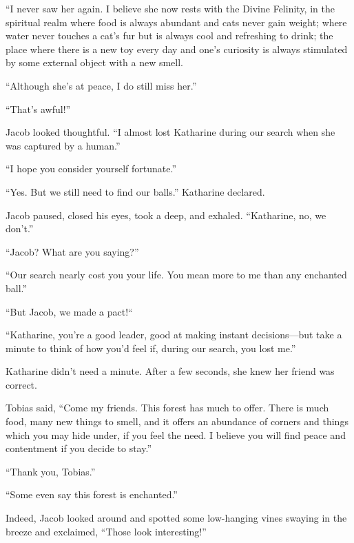 “I never saw her again. I believe she now rests with the Divine Felinity, in the spiritual realm where food is always abundant and cats never gain weight; where water never touches a cat's fur but is always cool and refreshing to drink; the place where there is a new toy every day and one's curiosity is always stimulated by some external object with a new smell.

“Although she's at peace, I do still miss her.”

“That's awful!”

Jacob looked thoughtful. “I almost lost Katharine during our search when she was captured by a human.”

“I hope you consider yourself fortunate.”

“Yes. But we still need to find our balls.” Katharine declared.

Jacob paused, closed his eyes, took a deep, and exhaled. “Katharine, no, we don't.”

“Jacob? What are you saying?”

“Our search nearly cost you your life. You mean more to me than any enchanted ball.”

“But Jacob, we made a pact!“

“Katharine, you're a good leader, good at making instant decisions—but take a minute to think of how you'd feel if, during our search, you lost me.”

Katharine didn't need a minute. After a few seconds, she knew her friend was correct.

Tobias said, “Come my friends. This forest has much to offer. There is much food, many new things to smell, and it offers an abundance of corners and things which you may hide under, if you feel the need. I believe you will find peace and contentment if you decide to stay.”

“Thank you, Tobias.”

“Some even say this forest is enchanted.”

Indeed, Jacob looked around and spotted some low-hanging vines swaying in the breeze and exclaimed, “Those look interesting!”
